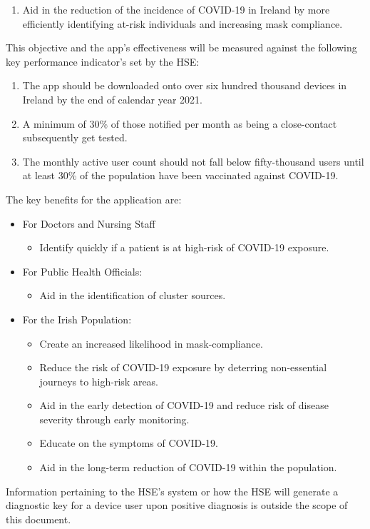 \documentclass{scrreprt}
\begin{document}
\begin{enumerate}
	\item Aid in the reduction of the incidence of COVID-19 in Ireland by more efficiently identifying at-risk individuals and increasing mask compliance.
\end{enumerate}
This objective and the app's effectiveness will be measured against the following key performance indicator's set by the HSE:
\begin{enumerate}
	\item The app should be downloaded onto over six hundred thousand devices in Ireland by the end of calendar year 2021.
	\item A minimum of $30\%$ of those notified per month as being a close-contact subsequently get tested.
	\item The monthly active user count should not fall below fifty-thousand users until at least 30\% of the population have been vaccinated against COVID-19.
\end{enumerate}
The key benefits for the application are:
\begin{itemize}
	\item For Doctors and Nursing Staff
		\begin{itemize}
			\item Identify quickly if a patient is at high-risk of COVID-19 exposure.
		\end{itemize}
	\item For Public Health Officials:
	\begin{itemize}
		\item Aid in the identification of cluster sources.
	\end{itemize}
	\item For the Irish Population:
	\begin{itemize}
		\item Create an increased likelihood in mask-compliance.
		\item Reduce the risk of COVID-19 exposure by deterring non-essential journeys to high-risk areas.
		\item Aid in the early detection of COVID-19 and reduce risk of disease severity through early monitoring.
		\item Educate on the symptoms of COVID-19.
		\item Aid in the long-term reduction of COVID-19 within the population.
	\end{itemize}
	
\end{itemize}
Information pertaining to the HSE's system or how the HSE will generate a diagnostic key for a device user upon positive diagnosis is outside the scope of this document.
\end{document}
